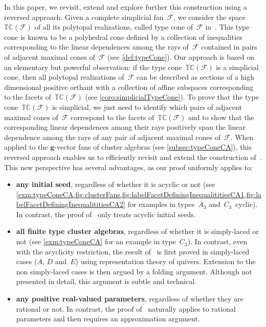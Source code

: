 \documentclass{amsart}
\theoremstyle{definition}
\renewcommand{\b}[1]{{\boldsymbol{#1}}} %
\newcommand{\Fan}{\mathcal{F}} %
\newcommand{\typeCone}{\mathbb{TC}} %
\begin{document}
\medskip
In this paper, we revisit, extend and explore further this construction using a reversed approach.
Given a complete simplicial fan~$\Fan$, we consider the space~$\typeCone(\Fan)$ of all its polytopal realizations, called type cone of~$\Fan$ in~\cite{McMullen-typeCone}.
This type cone is known to be a polyhedral cone defined by a collection of inequalities corresponding to the linear dependences among the rays of~$\Fan$ contained in pairs of adjacent maximal cones of~$\Fan$ (see \cref{def:typeCone}).
Our approach is based on an elementary but powerful observation: if the type cone~$\typeCone(\Fan)$ is a simplicial cone, then all polytopal realizations of~$\Fan$ can be described as sections of a high dimensional positive orthant with a collection of affine subspaces corresponding to the facets of~$\typeCone(\Fan)$ (see \cref{coro:simplicialTypeCone}).
To prove that the type cone~$\typeCone(\Fan)$ is simplicial, we just need to identify which pairs of adjacent maximal cones of~$\Fan$ correspond to the facets of~$\typeCone(\Fan)$ and to show that the corresponding linear dependences among their rays positively span the linear dependence among the rays of any pair of adjacent maximal cones of~$\Fan$.
When applied to the $\b{g}$-vector fans of cluster algebras (see \cref{subsec:typeConeCA}), this reversed approach enables us to efficiently revisit and extend the construction of~\cite{BazierMatteDouvilleMousavandThomasYildirim}.
This new perspective has several advantages, as our proof uniformly applies to:

\smallskip
\begin{itemize}
\item \textbf{any initial seed}, regardless of whether it is acyclic or not (see \cref{exm:typeConeCA,fig:clusterFans,fig:labelFacetDefiningInequalititiesCA1,fig:labelFacetDefiningInequalititiesCA2} for examples in types~$A_3$ and~$C_3$~cyclic). In contrast, the proof of~\cite{BazierMatteDouvilleMousavandThomasYildirim} only treats acyclic initial seeds.

\smallskip
\item \textbf{all finite type cluster algebras}, regardless of whether it is simply-laced or not (see \cref{exm:typeConeCA} for an example in type~$C_3$). In contrast, even with the acyclicity restriction, the result of~\cite{BazierMatteDouvilleMousavandThomasYildirim} is first proved in simply-laced cases ($A$, $D$ and~$E$) using representation theory of quivers. Extension to the non simply-laced cases is then argued by a folding argument. Although not presented in detail, this argument is subtle and technical.

\smallskip
\item \textbf{any positive real-valued parameters}, regardless of whether they are rational or not. In contrast, the proof of~\cite{BazierMatteDouvilleMousavandThomasYildirim} naturally applies to rational parameters and then requires an approximation argument.
\end{itemize}
\end{document}
